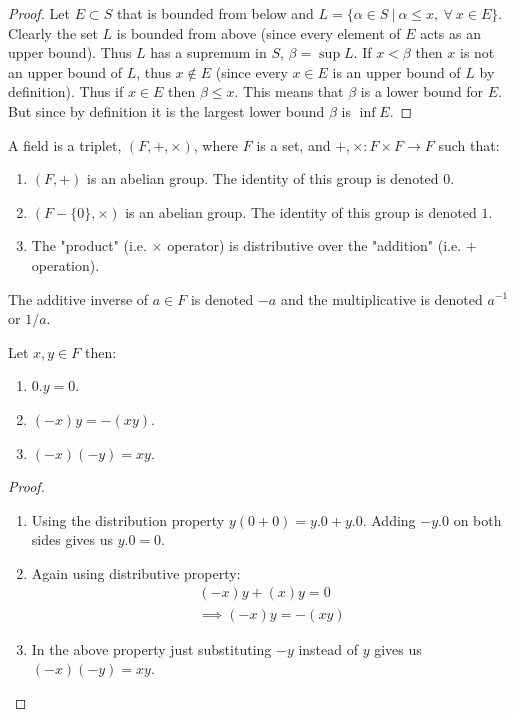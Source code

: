 \begin{proof}
  Let $E\subset S$ that is bounded from below and $L = \{\alpha\in S\ |\ \alpha\leq x,\ \forall\ x\in E \}$. Clearly the set $L$ is bounded from above (since every element of $E$ acts as an upper bound). Thus $L$ has a supremum in $S$, $\beta = \sup L$. If $x<\beta$ then $x$ is not an upper bound of $L$, thus $x\notin E$ (since every $x\in E$ is an upper bound of $L$ by definition). Thus if $x\in E$ then $\beta \leq x$. This means that $\beta$ is a lower bound for $E$. But since by definition it is the largest lower bound $\beta$ is $\inf E$.
\end{proof}
\begin{definition}[Fields]
  A field is a triplet, $(F, +, \times)$, where $F$ is a set, and $+,\times:F\times F\to F$ such that:
  \begin{enumerate}
    \item $(F, +)$ is an abelian group. The identity of this group is denoted $0$.
    \item $(F-\{0\}, \times)$ is an abelian group. The identity of this group is denoted $1$.
    \item The "product" (i.e. $\times$ operator) is distributive over the "addition" (i.e. $+$ operation). 
  \end{enumerate}
\end{definition}
The additive inverse of $a\in F$ is denoted $-a$ and the multiplicative is denoted $a^{-1}$ or $1/a$.
\begin{proposition}
  Let $x,y\in F$ then:
  \begin{enumerate}
    \item $0.y = 0$.
    \item $(-x)y = -(xy)$.
    \item $(-x)(-y) = xy$.
  \end{enumerate}
\end{proposition}
\begin{proof}
  \begin{enumerate}
    \item Using the distribution property $y(0+0) = y.0 + y.0$. Adding $-y.0$ on both sides gives us $y.0 = 0$.
    \item Again using distributive property:
      \begin{align*}
        (-x)y + (x)y = 0\\
        \implies (-x)y = -(xy)
      \end{align*}
    \item In the above property just substituting $-y$ instead of $y$ gives us $(-x)(-y) = xy$.
  \end{enumerate}
\end{proof}
